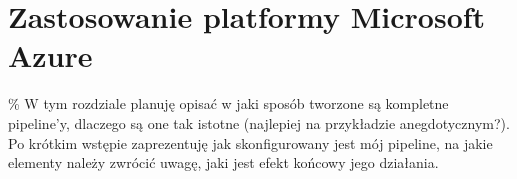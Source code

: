 \section{Zastosowanie platformy Microsoft Azure}

\% W tym rozdziale planuję opisać w jaki sposób tworzone są kompletne pipeline'y, 
dlaczego są one tak istotne (najlepiej na przykładzie anegdotycznym?).
Po krótkim wstępie zaprezentuję jak skonfigurowany jest mój pipeline,
na jakie elementy należy zwrócić uwagę, jaki jest efekt końcowy jego działania.